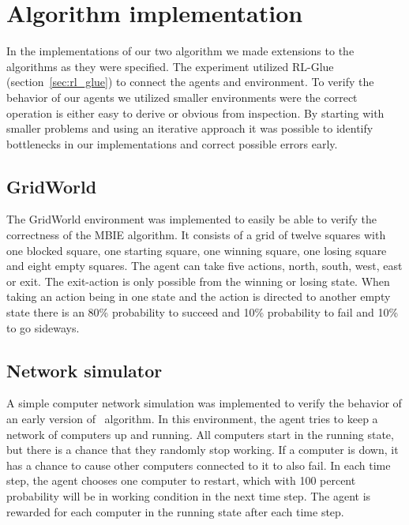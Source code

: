 \section{Algorithm implementation}
\label{sec:implementation}

In the implementations of our two algorithm we made extensions to the
algorithms as they were specified.  The experiment utilized RL-Glue
(section~\ref{sec:rl_glue}) to connect the agents and environment.  To verify
the behavior of our agents we utilized smaller environments were the correct
operation is either easy to derive or obvious from inspection. By starting with
smaller problems and using an iterative approach it was possible to identify
bottlenecks in our implementations and correct possible errors early.





\subsection{GridWorld}
\label{sec:intro_grid_world}

The GridWorld environment was implemented to easily be able to verify the
correctness of the MBIE algorithm. It consists of a grid of twelve squares with
one blocked square, one starting square, one winning square, one losing square and
eight empty squares. The agent can take five actions, north, south, west,
east or exit. The exit-action is only possible from the winning or losing
state. When taking an action being in one state and the action is directed to
another empty state there is an 80\% probability to succeed and 10\%
probability to fail and 10\% to go sideways.

\subsection{Network simulator}

A simple computer network simulation was implemented to verify the behavior of an
early version of \etre\ algorithm. In this environment, the agent tries to keep
a network of computers up and running. All computers start in the running
state, but there is a chance that they randomly stop working. If a computer is
down, it has a chance to cause other computers connected to it to also fail. In
each time step, the agent chooses one computer to restart, which with 100
percent probability will be in working condition in the next time step. The
agent is rewarded for each computer in the running state after each time step. 
